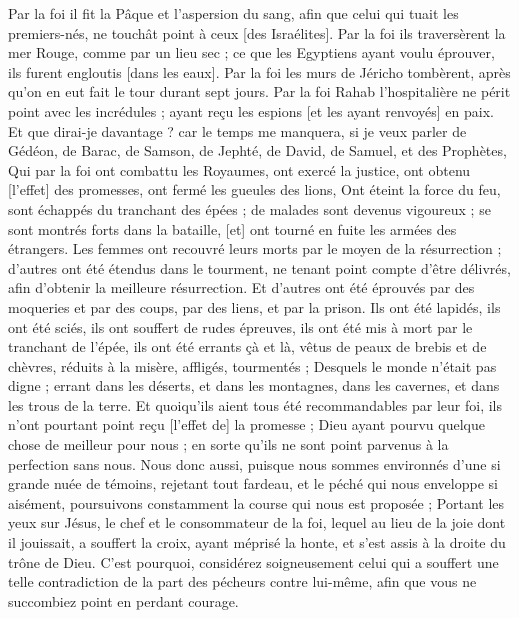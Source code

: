 \begin{multicols}{2}
Par la foi il fit la Pâque et l'aspersion du sang, afin que celui qui tuait les premiers-nés, ne touchât point à ceux [des Israélites].
Par la foi ils traversèrent la mer Rouge, comme par un lieu sec ; ce que les Egyptiens ayant voulu éprouver, ils furent engloutis [dans les eaux].
Par la foi les murs de Jéricho tombèrent, après qu'on en eut fait le tour durant sept jours.
Par la foi Rahab l'hospitalière ne périt point avec les incrédules ; ayant reçu les espions [et les ayant renvoyés] en paix.
Et que dirai-je davantage ? car le temps me manquera, si je veux parler de Gédéon, de Barac, de Samson, de Jephté, de David, de Samuel, et des Prophètes,
Qui par la foi ont combattu les Royaumes, ont exercé la justice, ont obtenu [l'effet] des promesses, ont fermé les gueules des lions,
Ont éteint la force du feu, sont échappés du tranchant des épées ; de malades sont devenus vigoureux ; se sont montrés forts dans la bataille, [et] ont tourné en fuite les armées des étrangers.
Les femmes ont recouvré leurs morts par le moyen de la résurrection ; d'autres ont été étendus dans le tourment, ne tenant point compte d'être délivrés, afin d'obtenir la meilleure résurrection.
Et d'autres ont été éprouvés par des moqueries et par des coups, par des liens, et par la prison.
Ils ont été lapidés, ils ont été sciés, ils ont souffert de rudes épreuves, ils ont été mis à mort par le tranchant de l'épée, ils ont été errants çà et là, vêtus de peaux de brebis et de chèvres, réduits à la misère, affligés, tourmentés ;
Desquels le monde n'était pas digne ; errant dans les déserts, et dans les montagnes, dans les cavernes, et dans les trous de la terre.
Et quoiqu'ils aient tous été recommandables par leur foi, ils n'ont pourtant point reçu [l'effet de] la promesse ;
Dieu ayant pourvu quelque chose de meilleur pour nous ; en sorte qu'ils ne sont point parvenus à la perfection sans nous.
\VerseOne{}Nous donc aussi, puisque nous sommes environnés d'une si grande nuée de témoins, rejetant tout fardeau, et le péché qui nous enveloppe si aisément, poursuivons constamment la course qui nous est proposée ;
Portant les yeux sur Jésus, le chef et le consommateur de la foi, lequel au lieu de la joie dont il jouissait, a souffert la croix, ayant méprisé la honte, et s'est assis à la droite du trône de Dieu.
C'est pourquoi, considérez soigneusement celui qui a souffert une telle contradiction de la part des pécheurs contre lui-même, afin que vous ne succombiez point en perdant courage.

\end{multicols}
